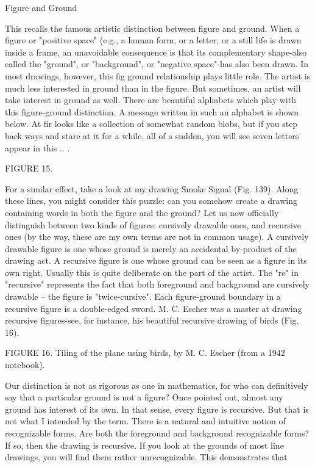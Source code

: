 Figure and Ground 

This recalls the famous artistic distinction between figure and ground. When a figure or "positive space" (e.g., a human form, or a letter, or a still life is drawn inside a frame, an unavoidable consequence is that its complementary shape-also called the "ground", or "background", or "negative space"-has also been drawn. In most drawings, however, this fig ground relationship plays little role. The artist is much less interested in ground than in the figure. But sometimes, an artist will take interest in ground as well. There are beautiful alphabets which play with this figure-ground distinction. A message written in such an alphabet is shown below. At fir looks like a collection of somewhat random blobs, but if you step back ways and stare at it for a while, all of a sudden, you will see seven letters appear in this .. . 







FIGURE 15. 



For a similar effect, take a look at my drawing Smoke Signal (Fig. 139). Along these lines, you might consider this puzzle: can you somehow create a drawing containing words in both the figure and the ground? Let us now officially distinguish between two kinds of figures: cursively drawable ones, and recursive ones (by the way, these are my own terms are not in common usage). A cursively drawable figure is one whose ground is merely an accidental by-product of the drawing act. A recursive figure is one whose ground can be seen as a figure in its own right. Usually this is quite deliberate on the part of the artist. The "re" in "recursive" represents the fact that both foreground and background are cursively drawable – the figure is "twice-cursive". Each figure-ground boundary in a recursive figure is a double-edged sword. M. C. Escher was a master at drawing recursive figures-see, for instance, his beautiful recursive drawing of birds (Fig. 16). 







FIGURE 16. Tiling of the plane using birds, by M. C. Escher (from a 1942 notebook). 

Our distinction is not as rigorous as one in mathematics, for who can definitively say that a particular ground is not a figure? Once pointed out, almost any ground has interest of its own. In that sense, every figure is recursive. But that is not what I intended by the term. There is a natural and intuitive notion of recognizable forms. Are both the foreground and background recognizable forms? If so, then the drawing is recursive. If you look at the grounds of most line drawings, you will find them rather unrecognizable. This demonstrates that 

